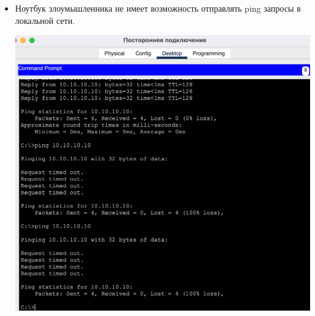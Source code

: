 \documentclass[a4paper,14pt]{extarticle}
\begin{document}
\begin{enumerate}
\begin{itemize}
                \item Ноутбук злоумышленника не имеет возможность отправлять ping запросы в локальной сети.
                    \begin{center}
                        \includegraphics[scale=0.5]{pics/11.1.10_2.png}
                    \end{center}


\end{itemize}
\end{enumerate}
\end{document}
